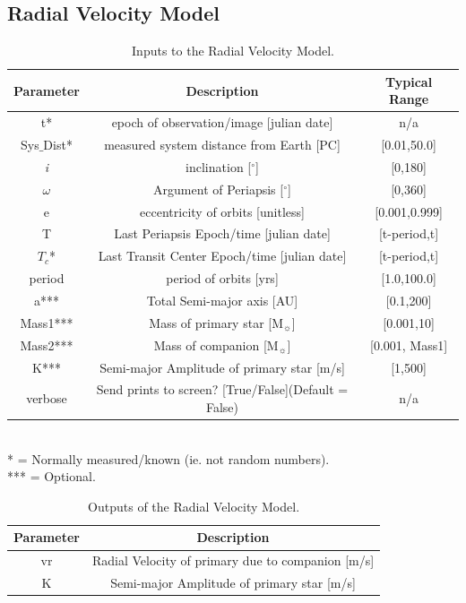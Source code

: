 \documentclass[12pt,preprint]{aastex}
\begin{document}
\subsection{Radial Velocity Model}
\begin{table}[h]
\centering
\caption{ Inputs to the Radial Velocity Model.}
\begin{tabular}{c c c}
\hline\hline
Parameter & Description & Typical Range \\
\hline
t* & epoch of observation/image [julian date] & n/a\\
Sys$\_$Dist* & measured system distance from Earth [PC] &  [0.01,50.0]\\
{\it i} & inclination [$^{\circ}$] & [0,180]\\
$\omega$ & Argument of Periapsis [$^{\circ}$] & [0,360]\\
e & eccentricity of orbits [unitless] & [0.001,0.999]\\
T & Last Periapsis Epoch/time [julian date] & [t-period,t]\\
$T_c$* & Last Transit Center Epoch/time [julian date] & [t-period,t]\\
period & period of orbits [yrs] & [1.0,100.0]\\
a*** & Total Semi-major axis [AU]  & [0.1,200] \\
Mass1*** & Mass of primary star [M$_{\sun}$] & [0.001,10] \\
Mass2*** & Mass of companion [M$_{\sun}$] & [0.001, Mass1] \\
K*** & Semi-major Amplitude of primary star [m/s]& [1,500]\\
verbose & Send prints to screen? [True/False](Default = False) & n/a\\
\hline
\end{tabular}
\\
  * = Normally measured/known (ie. not random numbers).\\
 *** = Optional.
\end{table}


\begin{table}[h]
\centering
\caption{ Outputs of the Radial Velocity Model.}
\begin{tabular}{c c}
\hline\hline
Parameter & Description \\
\hline
vr & Radial Velocity of primary due to companion [m/s] \\
K & Semi-major Amplitude of primary star [m/s]\\
\hline
\end{tabular}
\end{table}
\end{document}
